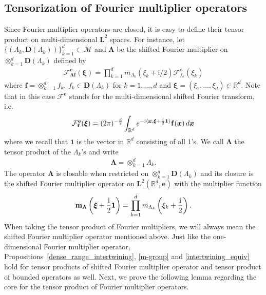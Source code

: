 \documentclass[12pt]{amsart}
\newcommand{\hlabel}{\phantomsection\label}
\numberwithin{equation}{section}
\newcommand{\bb}{\mathbb}
\newcommand{\cc}{\mathcal}
\newcommand{\bmrm}[2][2]{\mathbf{#2}^{#1}}
\newcommand{\fouh}{\mathcal{F}^{\mathbf{e}}}
\newcommand{\fouho}{\cc{F}^{e}}
\newcommand{\D}{\mathbf{D}}
\newcommand{\LL}{\Lambda}
\renewcommand{\i}{\mathrm{i}}
\newcommand{\mm}{\mathbf{m}}
\newcommand{\f}{\mathbf{f}}
\theoremstyle{definition}
\theoremstyle{assump}
\theoremstyle{remark}
\begin{document}
{\subsection{Tensorization of Fourier multiplier operators}\hlabel{sec:tens-sim} Since Fourier multiplier operators are closed, it is easy to define their tensor product on multi-dimensional $\bmrm{L}$ spaces. For instance, let $\{(\LL_k,\D(\LL_k))\}_{k=1}^d\subset\mathscr{M}$ and $\bm{\LL}$ be the shifted Fourier multiplier on $\otimes_{k=1}^d\D(\LL_k)$ defined by
\begin{align*}
\fouh_{\bm{\LL}\f}(\bm{\xi})=\prod_{k=1}^d m_{\LL_k}\left(\xi_k+\i/2\right)\fouho_{f_k}(\xi_k)
\end{align*}
where $\f=\otimes_{k=1}^d f_k$, $f_k\in\D(\LL_k)$ for $k=1,\ldots,d$ and $\bm{\xi}=(\xi_1,\ldots, \xi_d) \in \bb{R}^d$. Note that in this case $\fouh$ stands for the multi-dimensional shifted Fourier transform, i.e.~
\begin{align*}
\fouh_{\f}(\bm{\xi})=(2\pi)^{-\frac{d}{2}}\int_{\bb{R}^d} e^{-{\rm{i}}\langle\bm{x},\bm{\xi}+\frac{{\rm{i}}}{2}\bm{1} \rangle}\f(\bm{x})\,d\bm{x}
\end{align*}
where we  recall that $\bm{1}$ is the vector in $\bb{R}^d$ consisting of all $1$'s. We call $\bm{\LL}$  the tensor product of the $\LL_k$'s and write
\begin{align*}
\bm{\LL}=\otimes_{k=1}^d\LL_k.
\end{align*}
The operator $\bm{\LL}$ is closable when restricted on $\otimes_{k=1}^d\D(\LL_k)$ and its closure is the shifted Fourier multiplier operator on $\bmrm{L}(\bb{R}^d,\mathbf{e})$ with the multiplier function
\begin{align*}
\mm_{\bm{\LL}}\left(\bm{\xi}+\frac{{\rm{i}}}{2}\bm{1}\right)=\prod_{k=1}^d m_{\LL_k}\left(\xi_k+\frac{{\rm{i}}}{2}\right).
\end{align*}
When taking the tensor product of Fourier multipliers, we will always mean the shifted Fourier multiplier operator mentioned above. Just like the one-dimensional Fourier multiplier operator, Propositions~\ref{dense_range_intertwining}, \ref{m-group} and \ref{intertwining_equiv} hold for tensor products of shifted Fourier multiplier operator  and tensor product of bounded operators as well. Next, we prove the following lemma regarding the core for the tensor product of Fourier multiplier operators.

}
\end{document}
